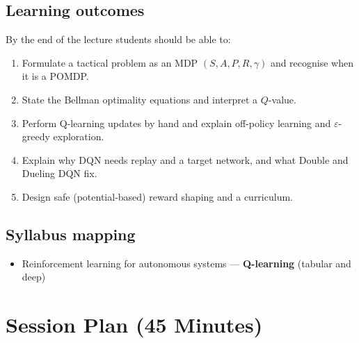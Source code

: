 \documentclass[11pt]{article}
\begin{document}
\subsection*{Learning outcomes}By the end of the lecture students should be able to:\begin{enumerate}\item Formulate a tactical problem as an MDP $(S,A,P,R,\gamma)$ and recognise when it is a POMDP.\item State the Bellman optimality equations and interpret a $Q$-value.\item Perform Q-learning updates by hand and explain off-policy learning and $\varepsilon$-greedy exploration.\item Explain why DQN needs replay and a target network, and what Double and Dueling DQN fix.\item Design safe (potential-based) reward shaping and a curriculum.\end{enumerate}

\subsection*{Syllabus mapping}\begin{itemize}\item Reinforcement learning for autonomous systems --- \textbf{Q-learning} (tabular and deep)\end{itemize}

\section{Session Plan (45 Minutes)}
\end{document}

